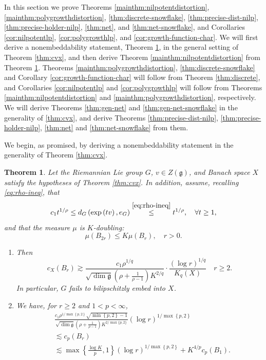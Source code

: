 \documentclass[11pt,reqno]{amsart}
\newtheorem{theorem}{Theorem}
\newcommand{\1}{\mathbf 1}
\begin{document}
In this section we prove Theorems \ref{mainthm:nilpotentdistortion}, \ref{mainthm:polygrowthdistortion}, \ref{thm:discrete-snowflake}, \ref{thm:precise-dist-nilp}, \ref{thm:precise-holder-nilp}, \ref{thm:net}, and \ref{thm:net-snowflake}, and Corollaries \ref{cor:nilpotentlp}, \ref{cor:polygrowthlp}, and \ref{cor:growth-function-char}. We will first derive a nonembeddability statement, Theorem \ref{thm:gendistortion}, in the general setting of Theorem \ref{thm:cvx}, and then derive Theorem \ref{mainthm:nilpotentdistortion} from Theorem \ref{thm:gendistortion}. 
Theorems \ref{mainthm:polygrowthdistortion}, \ref{thm:discrete-snowflake} and Corollary \ref{cor:growth-function-char} will follow from Theorem \ref{thm:discrete}, and Corollaries \ref{cor:nilpotentlp} and \ref{cor:polygrowthlp} will follow from Theorems \ref{mainthm:nilpotentdistortion} and \ref{mainthm:polygrowthdistortion}, respectively. 
We will derive Theorems \ref{thm:gen-net} and \ref{thm:gen-net-snowflake} in the generality of \ref{thm:cvx}, and derive Theorems \ref{thm:precise-dist-nilp}, \ref{thm:precise-holder-nilp}, \ref{thm:net} and \ref{thm:net-snowflake} from them.

We begin, as promised, by deriving a nonembeddability statement in the generality of Theorem \ref{thm:cvx}.

\begin{theorem}\label{thm:gendistortion}
Let the Riemannian Lie group $G$, $v\in Z\left(\mathfrak{g}\right)$, and Banach space $X$ satisfy the hypotheses of Theorem \ref{thm:cvx}. In addition, assume, recalling \eqref{eq:rho-ineq}, that
\begin{equation}\label{eq:rho-ineq-double}
c_1t^{1/\rho}\le d_G\left(\exp\left(tv\right),e_G\right)\stackrel{\eqref{eq:rho-ineq}}{\le} t^{1/\rho}, \quad \forall t\ge 1,
\end{equation}
and that the measure $\mu$ is $K$-doubling:
\[
\mu(B_{2r})\le K\mu(B_r),\quad r>0.
\]
\begin{enumerate}
    \item Then
\[
c_X\left(B_r\right)\gtrsim \frac{c_1\rho^{1/q}}{\sqrt{\dim \mathfrak{g}}\left(\rho+\frac{1}{\rho-1}\right)K^{2/q}} \cdot\frac{\left(\log r\right)^{1/q}}{K_q\left(X\right)}\quad r\ge 2.
\]
In particular, $G$ fails to bilipschitzly embed into $X$.
\item We have, for $r\ge 2$ and $1<p<\infty$,
\begin{align*}
&\frac{c_1\rho^{1/\max\left\{p,2\right\}}\sqrt{\min\left\{p,2\right\}-1}}{\sqrt{\dim \mathfrak{g}}\left(\rho+\frac{1}{\rho-1}\right)K^{2/\max\{p,2\}}} \left(\log r\right)^{1/\max\left\{p,2\right\}}\\
&\lesssim c_p\left(B_r\right)\\
&\lesssim \max\left\{\frac{\log K}{p},1\right\}\left(\log r\right)^{1/\max\left\{p,2\right\}}+ K^{4/p}c_p\left(B_1\right).
\end{align*}
\end{enumerate}

\end{theorem}
\end{document}
